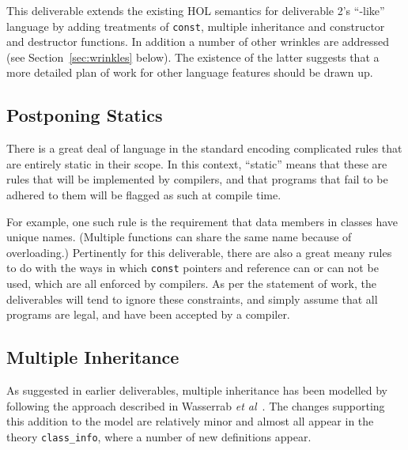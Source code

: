 \documentclass[11pt]{article}
\begin{document}
This deliverable extends the existing HOL semantics for deliverable
2's ``\cpp-like'' language by adding treatments of \texttt{const},
multiple inheritance and constructor and destructor functions.  In
addition a number of other wrinkles are addressed (see
Section~\ref{sec:wrinkles} below).  The existence of the latter
suggests that a more detailed plan of work for other language features
should be drawn up.

\subsection{Postponing Statics}

There is a great deal of language in the standard encoding complicated
rules that are entirely static in their scope.  In this context,
``static'' means that these are rules that will be implemented by
compilers, and that programs that fail to be adhered to them will be
flagged as such at compile time.

For example, one such rule is the requirement that data members in
classes have unique names.  (Multiple functions can share the same
name because of overloading.)  Pertinently for this deliverable, there
are also a great meany rules to do with the ways in which
\texttt{const} pointers and reference can or can not be used, which
are all enforced by compilers.  As per the statement of work,
the deliverables will tend to ignore these constraints, and simply
assume that all programs are legal, and have been accepted by a
compiler.


\subsection{Multiple Inheritance}
\label{sec:multiple-inheritance}

As suggested in earlier deliverables, multiple inheritance has been
modelled by following the approach described in Wasserrab \emph{et
  al}~\cite{wasserrab-nst-OOPSLA06}.  The changes supporting this
addition to the model are relatively minor and almost all appear in
the theory \texttt{class_info}, where a number of new definitions
appear.

\newcommand{\Cs}{\mathit{Cs}} \newcommand{\fld}{\mathit{fld}}
\end{document}
